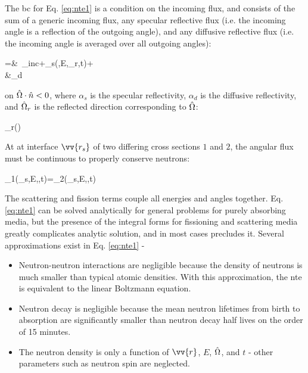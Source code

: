 The \gls{bc} for Eq. \eqref{eq:nte1} is a condition on the incoming flux, and consists of the sum of a generic incoming flux, any specular reflective flux (i.e. the incoming angle is a reflection of the outgoing angle), and any diffusive reflective flux (i.e. the incoming angle is averaged over all outgoing angles):

\beqa
\label{eq:NTEBCs}
\psi\seat=&\ \psi_{inc}\seat+\alpha_s\seat\psi(,E,\hO_r,t)+\\
&\hspace{1cm}\alpha_d\seat{}
\eeqa

on \(\hat{\Omega}\cdot\hat{n}<0\), where \(\alpha_s\) is the specular reflectivity, \(\alpha_d\) is the diffusive reflectivity, and \(\hat{\Omega}_r\) is the reflected direction corresponding to \(\hat{\Omega}\):

\beq
\label{eq:hOrDef}
\hO_r\equiv{}\left(\hO\cdot{}\right)
\eeq

At at interface \(\vv{r_s}\) of two differing cross sections \(1\) and \(2\), the angular flux must be continuous to properly conserve neutrons:

\beq
\label{eq:NTE_interface}
\psi_1(_s,E,\hO,t)=\psi_2(_s,E,\hO,t)
\eeq

The scattering and fission terms couple all energies and angles together. Eq. \eqref{eq:nte1} can be solved analytically for general problems for purely absorbing media, but the presence of the integral forms for fissioning and scattering media greatly complicates analytic solution, and in most cases precludes it. Several approximations exist in Eq. \eqref{eq:nte1} -

\begin{itemize}
\item Neutron-neutron interactions are negligible because the density of neutrons is much smaller than typical atomic densities. With this approximation, the \gls{nte} is equivalent to the linear Boltzmann equation.
\item Neutron decay is negligible because the mean neutron lifetimes from birth to absorption are significantly smaller than neutron decay half lives on the order of 15 minutes.
\item The neutron density is only a function of \(\vv{r}\), \(E\), \(\hat{\Omega}\), and \(t\) - other parameters such as neutron spin are neglected.
\end{itemize}

